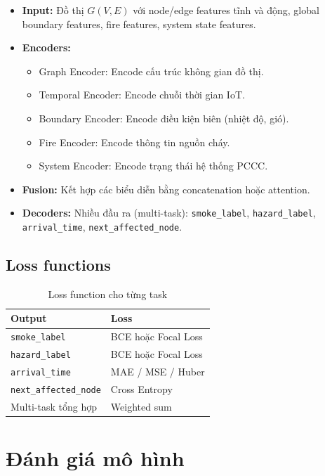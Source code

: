 \begin{itemize}
  \item \textbf{Input:} Đồ thị $G(V,E)$ với node/edge features tĩnh và động, global boundary features, fire features, system state features.
  \item \textbf{Encoders:}
  \begin{itemize}
    \item Graph Encoder: Encode cấu trúc không gian đồ thị.
    \item Temporal Encoder: Encode chuỗi thời gian IoT.
    \item Boundary Encoder: Encode điều kiện biên (nhiệt độ, gió).
    \item Fire Encoder: Encode thông tin nguồn cháy.
    \item System Encoder: Encode trạng thái hệ thống PCCC.
  \end{itemize}
  \item \textbf{Fusion:} Kết hợp các biểu diễn bằng concatenation hoặc attention.
  \item \textbf{Decoders:} Nhiều đầu ra (multi-task): \texttt{smoke\_label}, \texttt{hazard\_label}, \texttt{arrival\_time}, \texttt{next\_affected\_node}.
\end{itemize}

\subsection{Loss functions}

\begin{table}[H]
\centering
\caption{Loss function cho từng task}
\label{tab:loss}
\begin{tabular}{l l}
\toprule
\textbf{Output} & \textbf{Loss} \\
\midrule
\texttt{smoke\_label}        & BCE hoặc Focal Loss \\
\texttt{hazard\_label}       & BCE hoặc Focal Loss \\
\texttt{arrival\_time}       & MAE / MSE / Huber \\
\texttt{next\_affected\_node} & Cross Entropy \\
Multi-task tổng hợp          & Weighted sum \\
\bottomrule
\end{tabular}
\end{table}

\section{Đánh giá mô hình}
\label{sec:evaluation}

